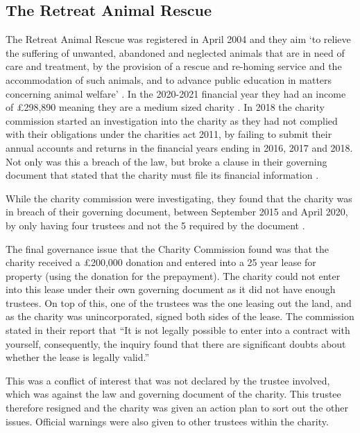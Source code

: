 \documentclass{UoYCSproject}
\begin{document}
\subsection{The Retreat Animal Rescue}
The Retreat Animal Rescue was registered in April 2004 and they aim ‘to relieve the suffering of unwanted, abandoned and neglected animals that are in need of care and treatment, by the provision of a rescue and re-homing service and the accommodation of such animals, and to advance public education in matters concerning animal welfare’ \cite{animal_rescue_report}. In the 2020-2021 financial year they had an income of £298,890 meaning they are a medium sized charity \cite{animal_rescue_finance}. In 2018 the charity commission started an investigation into the charity as they had not complied with their obligations under the charities act 2011, by failing to submit their annual accounts and returns in the financial years ending in 2016, 2017 and 2018. Not only was this a breach of the law, but broke a clause in their governing document that stated that the charity must file its financial information \cite{animal_rescue_report}. 

While the charity commission were investigating, they found that the charity was in breach of their governing document, between September 2015 and April 2020, by only having four trustees and not the 5 required by the document \cite{animal_rescue_report}. 

The final governance issue that the Charity Commission found was that the charity received a £200,000 donation and entered into a 25 year lease for property (using the donation for the prepayment). The charity could not enter into this lease under their own governing document as it did not have enough trustees. On top of this, one of the trustees was the one leasing out the land, and as the charity was unincorporated, signed both sides of the lease. The commission stated in their report that “It is not legally possible to enter into a contract with yourself, consequently, the inquiry found that there are significant doubts about whether the lease is legally valid.”\cite{animal_rescue_report}

This was a conflict of interest that was not declared by the trustee involved, which was against the law and governing document of the charity. This trustee therefore resigned and the charity was given an action plan to sort out the other issues. Official warnings were also given to other trustees within the charity\cite{animal_rescue_report}.
\end{document}
